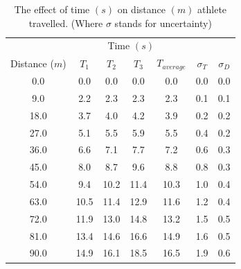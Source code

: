 \documentclass[index]{subfiles}
\begin{document}
\begin{table}[H]
    \centering
    \caption{The effect of time \((s)\) on distance \((m)\) athlete travelled. (Where \(\sigma\) stands for uncertainty)}
    \begin{tabular}{@{}ccccccc@{}} \toprule
                         & \multicolumn{4}{c}{Time \((s)\)}                                                                         \\ \cmidrule(r){2-5}
        Distance (\(m\)) & \(T_1\)                          & \(T_2\) & \(T_3\) & \(T_{average}\) & \(\sigma_{T}\) & \(\sigma_{D}\) \\ \midrule
        0.0              & 0.0                              & 0.0     & 0.0     & 0.0             & 0.0            & 0.0            \\
        9.0              & 2.2                              & 2.3     & 2.3     & 2.3             & 0.1            & 0.1            \\
        18.0             & 3.7                              & 4.0     & 4.2     & 3.9             & 0.2            & 0.2            \\
        27.0             & 5.1                              & 5.5     & 5.9     & 5.5             & 0.4            & 0.2            \\
        36.0             & 6.6                              & 7.1     & 7.7     & 7.2             & 0.6            & 0.3            \\
        45.0             & 8.0                              & 8.7     & 9.6     & 8.8             & 0.8            & 0.3            \\
        54.0             & 9.4                              & 10.2    & 11.4    & 10.3            & 1.0            & 0.4            \\
        63.0             & 10.5                             & 11.4    & 12.9    & 11.6            & 1.2            & 0.4            \\
        72.0             & 11.9                             & 13.0    & 14.8    & 13.2            & 1.5            & 0.5            \\
        81.0             & 13.4                             & 14.6    & 16.6    & 14.9            & 1.6            & 0.5            \\
        90.0             & 14.9                             & 16.1    & 18.5    & 16.5            & 1.9            & 0.6            \\

\end{tabular}
\end{table}
\end{document}
